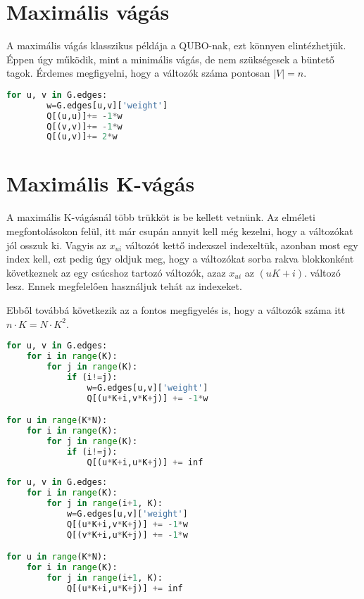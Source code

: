 \section{Maximális vágás}

A maximális vágás klasszikus példája a QUBO-nak, ezt könnyen elintézhetjük. Éppen úgy működik, mint a minimális vágás, de nem szükségesek a büntető tagok. Érdemes megfigyelni, hogy a változók száma pontosan $|V|=n$.

\begin{lstlisting}[language=python,caption=Max-cut QUBO,label=code:maxCutQUBO]
	for u, v in G.edges:
		w=G.edges[u,v]['weight']
		Q[(u,u)]+= -1*w
		Q[(v,v)]+= -1*w
		Q[(u,v)]+= 2*w
\end{lstlisting}


\section{Maximális K-vágás}

A maximális K-vágásnál több trükköt is be kellett vetnünk. Az elméleti megfontolásokon felül, itt már csupán annyit kell még kezelni, hogy a változókat jól osszuk ki. Vagyis az $x_{ui}$ változót kettő indexszel indexeltük, azonban most egy index kell, ezt pedig úgy oldjuk meg, hogy a változókat sorba rakva blokkonként következnek az egy csúcshoz tartozó változók, azaz $x_{ui}$ az $(uK+i)$. változó lesz. Ennek megfelelően használjuk tehát az indexeket.

Ebből továbbá következik az a fontos megfigyelés is, hogy a változók száma itt $n \cdot K = N \cdot K^2$.

\begin{lstlisting}[language=python,caption=Max-K-cut QUBO, label=code:maxKCutQUBO]
for u, v in G.edges:
	for i in range(K):
		for j in range(K):
			if (i!=j):
				w=G.edges[u,v]['weight']
				Q[(u*K+i,v*K+j)] += -1*w

for u in range(K*N):
	for i in range(K):
		for j in range(K):
			if (i!=j):
				Q[(u*K+i,u*K+j)] += inf 
\end{lstlisting}

\begin{lstlisting}[language=python,caption=Max-K-cut QUBO (alternatív),label=code:maxKCutQUBOAlt]
for u, v in G.edges:
	for i in range(K):
		for j in range(i+1, K):
			w=G.edges[u,v]['weight']
			Q[(u*K+i,v*K+j)] += -1*w
			Q[(v*K+i,u*K+j)] += -1*w

for u in range(K*N):
	for i in range(K):
		for j in range(i+1, K):
			Q[(u*K+i,u*K+j)] += inf
\end{lstlisting}


